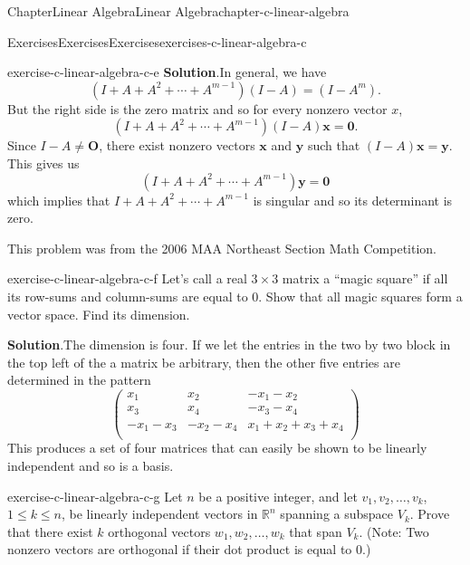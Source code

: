\documentclass[oneside,10pt,]{book}
\newcommand{\blocktitlefont}{\relax}
\numberwithin{equation}{section}
\renewcommand{\vec}[1]{\mathbf{#1}}
\begin{document}
\begin{chapterptx}{Chapter}{Linear Algebra}{}{Linear Algebra}{}{}{chapter-c-linear-algebra}
\begin{exercises-section}{Exercises}{Exercises}{}{Exercises}{}{}{exercises-c-linear-algebra-c}
\begin{divisionexercise}{4}{}{}{exercise-c-linear-algebra-c-e}
\noindent\textbf{\blocktitlefont Solution}.\hypertarget{solution-c-linear-algebra-c-e-c}{}\quad{}In general, we have%
\begin{equation*}
(I +  A + A^2 + \cdots + A^{m-1})(I -A)=(I-A^m).
\end{equation*}
But the right side is the zero matrix and so for every nonzero vector \(x\),%
\begin{equation*}
(I +  A + A^2 + \cdots + A^{m-1})(I -A)\vec{x}=\vec{0}.
\end{equation*}
Since \(I-A \neq \vec{O}\), there exist nonzero vectors \(\vec{x}\) and \(\vec{y}\) such that \((I-A)\vec{x} = \vec{y}\).  This gives us%
\begin{equation*}
(I +  A + A^2 + \cdots + A^{m-1})\vec{y}=\vec{0}
\end{equation*}
which implies that \(I +  A + A^2 + \cdots + A^{m-1}\) is singular and so its determinant is zero.%
\par
This problem was from the 2006 MAA Northeast Section Math Competition.%
\end{divisionexercise}%
\begin{divisionexercise}{5}{}{}{exercise-c-linear-algebra-c-f}%
Let's call a real \(3 \times 3\) matrix a ``magic square'' if all its row-sums and column-sums are equal to 0. Show that all magic squares form a vector space. Find its dimension.%
\par\smallskip%
\noindent\textbf{\blocktitlefont Solution}.\hypertarget{solution-c-linear-algebra-c-f-b}{}\quad{}The dimension is four.  If we let the entries in the two by two block in the top left of the a matrix be arbitrary, then the other five entries are determined in the pattern%
\begin{equation*}
\left(
\begin{array}{ccc}
x_1 & x_2 & -x_1-x_2 \\
x_3 & x_4 & -x_3-x_4 \\
-x_1-x_3 & -x_2-x_4 & x_1+x_2+x_3+x_4 \\
\end{array}
\right)
\end{equation*}
This produces a set of four matrices that can easily be shown to be linearly independent and so is a basis.%
\end{divisionexercise}%
\begin{divisionexercise}{6}{}{}{exercise-c-linear-algebra-c-g}%
Let \(n\) be a positive integer, and let \(v_1, v_2, \ldots ,v_k\), \(1\leq k\leq n\), be linearly independent vectors in \(\mathbb{R}^n\) spanning a subspace \(V_k\). Prove that there exist \(k\) orthogonal vectors \(w_1, w_2, \ldots ,w_k\) that span \(V_k\).  (Note: Two nonzero vectors are orthogonal if their dot product is equal to 0.)%

\end{divisionexercise}
\end{exercises-section}
\end{chapterptx}
\end{document}
